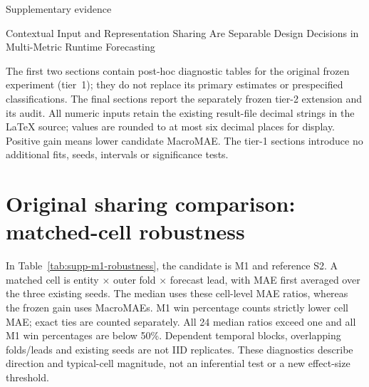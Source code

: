 \documentclass[a4paper,11pt]{article}
\begin{document}
\begin{center}
{\Large Supplementary evidence}\par\medskip
Contextual Input and Representation Sharing Are Separable Design
Decisions in Multi-Metric Runtime Forecasting
\end{center}

The first two sections contain post-hoc diagnostic tables for the original
frozen experiment (tier~1); they do not replace its primary estimates or
prespecified classifications. The final sections report the separately
frozen tier-2 extension and its audit.
All numeric inputs retain the existing result-file decimal strings in the
LaTeX source; values are rounded to at most six decimal places for display.
Positive gain means lower candidate MacroMAE. The tier-1 sections introduce
no additional fits, seeds, intervals or significance tests.

\section*{Original sharing comparison: matched-cell robustness}
In Table~\ref{tab:supp-m1-robustness}, the candidate is M1 and reference S2.
A matched cell is entity $\times$ outer fold $\times$ forecast lead, with
MAE first averaged over the three existing seeds. The median uses these
cell-level MAE ratios, whereas the frozen gain uses MacroMAEs. M1 win
percentage counts strictly lower cell MAE; exact ties are counted separately.
All 24 median ratios exceed one and all M1 win percentages are below 50\%.
Dependent temporal blocks, overlapping folds/leads and existing seeds are
not IID replicates. These diagnostics describe direction and typical-cell
magnitude, not an inferential test or a new effect-size threshold.
\end{document}
